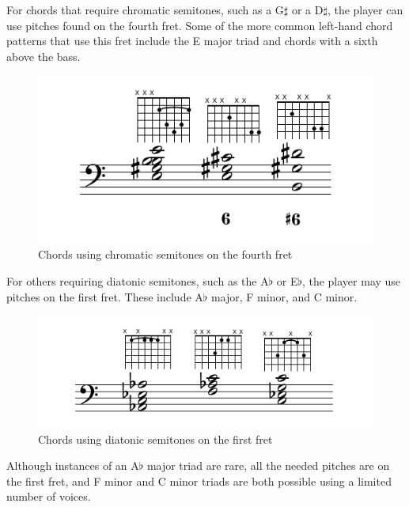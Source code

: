 For chords that require chromatic semitones, such as a G$\sharp$ or a D$\sharp$, the
player can use pitches found on the fourth fret. Some of the more common left-hand chord
patterns that use this fret include the E major triad and chords with a
sixth above the bass.
\begin{figure}[h]
\centering
\includegraphics{examples/g-sharp.pdf}
\caption{Chords using chromatic semitones on the fourth fret}
\label{fourth-fret-chords}
\end{figure}
For others requiring diatonic semitones, such as the A$\flat$ or E$\flat$, the
player may use pitches on the first fret. These include A$\flat$ major, F minor, and C
minor.
\begin{figure}[h]
\centering
\includegraphics{examples/a-flat.pdf}
\caption{Chords using diatonic semitones on the first fret}
\label{first-fret-chords}
\end{figure}
Although instances of an A$\flat$ major triad are rare, all the needed pitches are on
the first fret, and F minor and C minor triads are both possible using a limited
number of voices.

